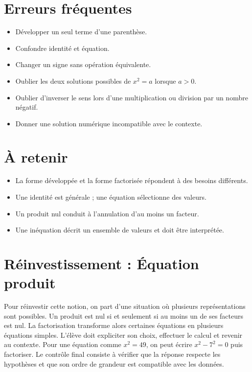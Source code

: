 \section{Erreurs fréquentes}
\begin{itemize}
\item Développer un seul terme d’une parenthèse.
\item Confondre identité et équation.
\item Changer un signe sans opération équivalente.
\item Oublier les deux solutions possibles de $x^2=a$ lorsque $a>0$.
\item Oublier d’inverser le sens lors d’une multiplication ou division par un nombre négatif.
\item Donner une solution numérique incompatible avec le contexte.
\end{itemize}

\section{À retenir}
\begin{aretenir}
\begin{itemize}
\item La forme développée et la forme factorisée répondent à des besoins différents.
\item Une identité est générale ; une équation sélectionne des valeurs.
\item Un produit nul conduit à l’annulation d’au moins un facteur.
\item Une inéquation décrit un ensemble de valeurs et doit être interprétée.
\end{itemize}
\end{aretenir}

\section{Réinvestissement : Équation produit}
Pour réinvestir cette notion, on part d’une situation où plusieurs représentations sont possibles. Un produit est nul si et seulement si au moins un de ses facteurs est nul. La factorisation transforme alors certaines équations en plusieurs équations simples. L’élève doit expliciter son choix, effectuer le calcul et revenir au contexte. Pour une équation comme $x^2=49$, on peut écrire $x^2-7^2=0$ puis factoriser. Le contrôle final consiste à vérifier que la réponse respecte les hypothèses et que son ordre de grandeur est compatible avec les données.

